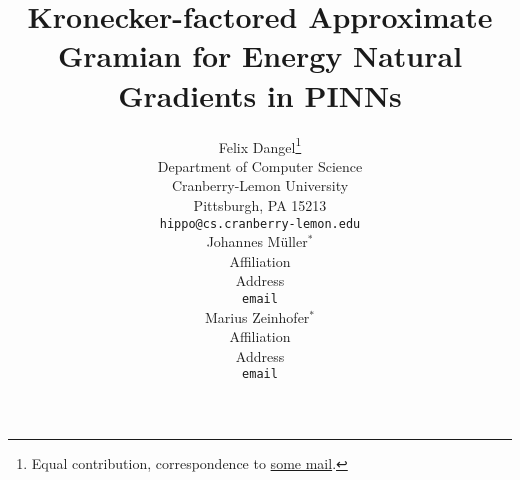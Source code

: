 \newcommand{\papertitle}{%
  Kronecker-factored Approximate Gramian for Energy Natural Gradients in PINNs
}
\title{\papertitle}

%

\author{%
  Felix Dangel\thanks{Equal contribution, correspondence to \url{some mail}.}\\
  Department of Computer Science\\
  Cranberry-Lemon University\\
  Pittsburgh, PA 15213 \\
  \texttt{hippo@cs.cranberry-lemon.edu} \\
  \And
  Johannes M\"uller$^*$\\
  Affiliation \\
  Address \\
  \texttt{email} \\
  \And
  Marius Zeinhofer$^*$\\
  Affiliation \\
  Address \\
  \texttt{email} \\
}
